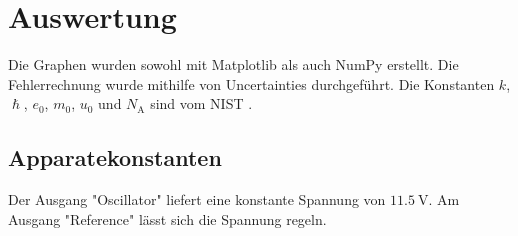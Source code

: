 \section{Auswertung}
\label{sec:Auswertung}


Die Graphen wurden sowohl mit Matplotlib \cite{matplotlib} als auch NumPy \cite{numpy} erstellt. Die
Fehlerrechnung wurde mithilfe von Uncertainties \cite{uncertainties} durchgeführt.
Die Konstanten $k$, $\hslash$, $e_0$, $m_0$, $u_0$ und $N_\text{A}$ sind vom NIST \cite{nistgov}.

\subsection{Apparatekonstanten}
\label{sec:Apparatekonstanten}
Der Ausgang "Oscillator" liefert eine konstante Spannung von $\SI{11,5}{\volt}$.
Am Ausgang "Reference" lässt sich die Spannung regeln.

